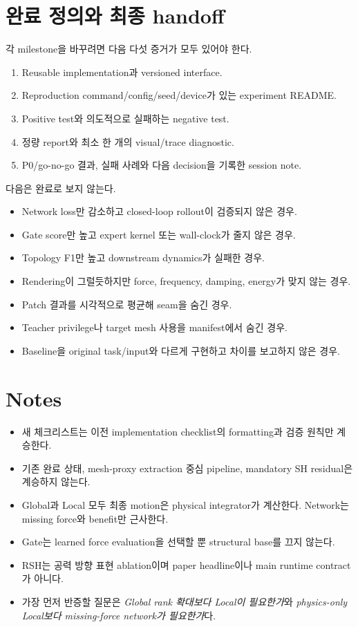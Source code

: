 \documentclass[10pt,a4paper]{article}
\newcommand{\done}{\textcolor{DoneGreen}{\(\boxtimes\)}}
\begin{document}
\section{완료 정의와 최종 handoff}

각 milestone을  바꾸려면 다음 다섯 증거가 모두 있어야 한다.

\begin{enumerate}
  \item Reusable implementation과 versioned interface.
  \item Reproduction command/config/seed/device가 있는 experiment README.
  \item Positive test와 의도적으로 실패하는 negative test.
  \item 정량 report와 최소 한 개의 visual/trace diagnostic.
  \item P0/go-no-go 결과, 실패 사례와 다음 decision을 기록한 session note.
\end{enumerate}

다음은 완료로 보지 않는다.

\begin{itemize}
  \item Network loss만 감소하고 closed-loop rollout이 검증되지 않은 경우.
  \item Gate score만 높고 expert kernel 또는 wall-clock가 줄지 않은 경우.
  \item Topology F1만 높고 downstream dynamics가 실패한 경우.
  \item Rendering이 그럴듯하지만 force, frequency, damping, energy가 맞지 않는 경우.
  \item Patch 결과를 시각적으로 평균해 seam을 숨긴 경우.
  \item Teacher privilege나 target mesh 사용을 manifest에서 숨긴 경우.
  \item Baseline을 original task/input와 다르게 구현하고 차이를 보고하지 않은 경우.
\end{itemize}

\section*{Notes}

\begin{itemize}
  \item 새 체크리스트는 이전 implementation checklist의 formatting과 검증 원칙만 계승한다.
  \item 기존 완료 상태, mesh-proxy extraction 중심 pipeline, mandatory SH residual은 계승하지 않는다.
  \item Global과 Local 모두 최종 motion은 physical integrator가 계산한다. Network는 missing force와 benefit만 근사한다.
  \item Gate는 learned force evaluation을 선택할 뿐 structural base를 끄지 않는다.
  \item RSH는 공력 방향 표현 ablation이며 paper headline이나 main runtime contract가 아니다.
  \item 가장 먼저 반증할 질문은 \emph{Global rank 확대보다 Local이 필요한가}와
  \emph{physics-only Local보다 missing-force network가 필요한가}다.
\end{itemize}
\end{document}
